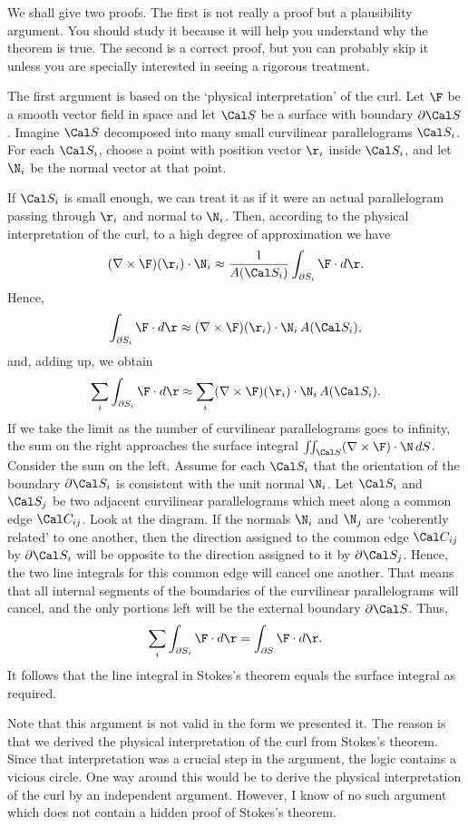 We shall give two proofs.  The first is not really a proof but a
plausibility argument.  You should study it because it will help
you understand why the theorem is true.   The second is a correct
proof, but you can probably skip it unless you are specially interested
in seeing a rigorous treatment.

The first argument is based on the `physical interpretation' of
the curl.  Let $\F$ be a smooth vector field in space and let
$\Cal S$ be a surface with boundary $\partial \Cal S$.  Imagine
$\Cal S$ decomposed into many small curvilinear parallelograms
$\Cal S_i$.   For each $\Cal S_i$, choose a point with position
vector $\r_i$ inside $\Cal S_i$, and let $\N_i$ be the normal
vector at that point.  
\medskip
\centerline{}
\medskip
If $\Cal S_i$ is small enough,
we can treat it as if it were an actual parallelogram passing through
$\r_i$ and normal to $\N_i$.  Then, according to the physical interpretation
of the curl, to a high degree of approximation we have
$$
(\nabla\times\F)(\r_i)\cdot\N_i \approx \frac 1{A(\Cal S_i)}\int_{\partial S_i}
\F\cdot d\r.
$$
Hence,
$$
\int_{\partial S_i}\F\cdot d\r
\approx 
(\nabla\times\F)(\r_i)\cdot\N_i\, A(\Cal S_i),
$$
and, adding up, we obtain
$$
\sum_i \int_{\partial S_i} \F\cdot d\r
\approx
\sum_i (\nabla\times\F)(\r_i)\cdot\N_i \,A(\Cal S_i).
$$
If we take the limit as the number of curvilinear parallelograms goes
to infinity, the sum on the right approaches the surface integral
$\iint_{\Cal S}(\nabla\times\F)\cdot\N\,dS$.   Consider 
the sum on the left.  Assume for each $\Cal S_i$ that the orientation
of the boundary $\partial \Cal S_i$ is consistent with the
unit normal $\N_i$.  Let $\Cal S_i$ and $\Cal S_j$ be two
adjacent curvilinear parallelograms which meet along a common edge
$\Cal C_{ij}$.   Look at the diagram.  
If the normals $\N_i$ and
$\N_j$ are `coherently related' to one another, then 
the direction assigned to  the common edge
$\Cal C_{ij}$ by $\partial \Cal S_i$ will
be opposite to the direction assigned to it by $\partial \Cal S_j$.
Hence, the two line integrals for this common edge will cancel one
another.   That means that all internal segments of the boundaries
of the curvilinear parallelograms will cancel, and the only portions
left will be the external boundary $\partial \Cal S$.  Thus,
$$
\sum_i \int_{\partial S_i} \F\cdot d\r
= \int_{\partial S}\F\cdot d\r.
$$
It follows that the line integral in Stokes's theorem equals the
surface integral as required.

Note that this argument is not valid in the form we presented it.
The reason is that we derived the physical interpretation of
the curl from Stokes's theorem.  Since that interpretation was
a crucial step in the argument, the logic contains a vicious
circle.  One way around this would be to derive the physical
interpretation of the curl by an independent argument.  However,
I know of no such argument which does not contain a hidden
proof of Stokes's theorem.

